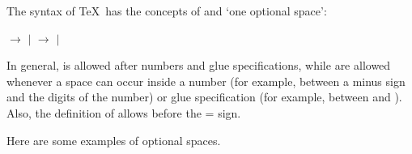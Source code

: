 \documentclass{book}
\begin{document}
The syntax of \TeX\ has the concepts of 
and `one optional space':
\begin{disp} $\longrightarrow$
 $|$ \nl
{} $\longrightarrow$
 $|$ \end{disp}
In general,  is allowed after
numbers and glue specifications, while  are
allowed whenever a space can occur inside a number
(for example, between a minus sign and the digits of the number)
or glue specification (for example, between  and ).
Also, the definition of  allows 
before the \n= sign.

Here are some examples of optional spaces.
\end{document}
